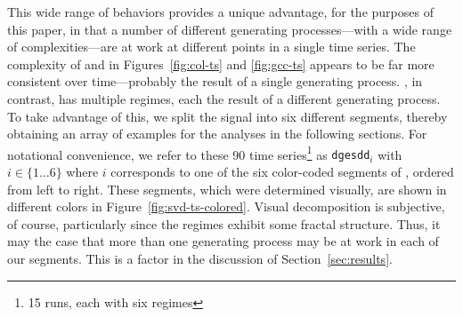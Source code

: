 This wide range of behaviors provides a unique advantage, for the
purposes of this paper, in that a number of different generating
processes---with a wide range of complexities---are at work at
different points in a single time series.  The complexity of \col and
\gcc in Figures~\ref{fig:col-ts} and \ref{fig:gcc-ts} appears to be
far more consistent over time---probably the result of a single
generating process.  \svd, in contrast, has multiple regimes, each the
result of a different generating process.  To take advantage of this,
we split the signal into six different segments, thereby obtaining an
array of examples for the analyses in the following sections.  For
notational convenience, we refer to these 90 time series\footnote{15
  runs, each with six regimes} as {\tt dgesdd$_i$} with $i \in
\{1\dots6\}$ where $i$ corresponds to one of the six color-coded
segments of \svd, ordered from left to right.  These segments, which
were determined visually, are shown in different colors in
Figure~\ref{fig:svd-ts-colored}.  Visual decomposition is subjective,
of course, particularly since the regimes exhibit some fractal
structure.  Thus, it may the case that more than one generating
process may be at work in each of our segments.  This is a factor in
the discussion of Section~\ref{sec:results}.

